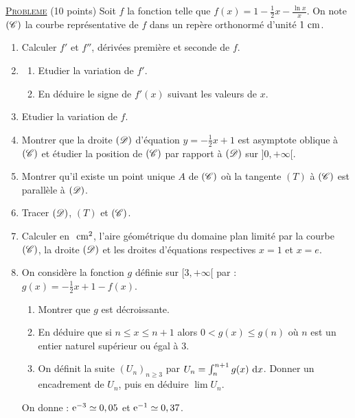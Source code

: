 \noindent \underline{\textsc{Probleme}} (10 points) \newline
      Soit $f$ la fonction telle que $f(x) = 1 - \frac{1}{2} x - \frac{\ln x}{x}$.
      On note $(\mathscr{C})$ la courbe repr\'esentative de $f$ dans un rep\`ere orthonorm\'e \Oij{} d'unit\'e $1~\mathrm{cm}$.
      \begin{enumerate}
            \item Calculer $f'$ et $f''$, d\'eriv\'ees premi\`ere et seconde de $f$.
            \item \begin{enumerate}
                        \item Etudier la variation de $f'$.
                        \item En d\'eduire le signe de $f'(x)$ suivant les valeurs de $x$.
                  \end{enumerate}
            \item Etudier la variation de $f$.
            \item Montrer que la droite $(\mathscr{D})$ d'\'equation $y = - \frac{1}{2} x + 1$ est asymptote oblique \`a $(\mathscr{C})$
                  et \'etudier la position de $(\mathscr{C})$ par rapport \`a $(\mathscr{D})$ sur $]0,+\infty[$.
            \item Montrer qu'il existe un point unique $A$ de $(\mathscr{C})$ o\`u la tangente $(T)$ \`a $(\mathscr{C})$ est
                  parall\`ele \`a $(\mathscr{D})$.
            \item Tracer $(\mathscr{D})$, $(T)$ et $(\mathscr{C})$.
            \item Calculer en $~\mathrm{cm}^2$, l'aire g\'eom\'etrique du domaine plan limit\'e par la courbe $(\mathscr{C})$, 
                  la droite $(\mathscr{D})$ et les droites d'\'equations respectives $x = 1$ et $x = e$.
            \item On consid\`ere la fonction $g$ d\'efinie sur $[3,+\infty[$ par : $g(x) = -\frac{1}{2} x + 1 - f(x)$.
                  \begin{enumerate}
                        \item Montrer que $g$ est d\'ecroissante.
                        \item En d\'eduire que si $n \leq x \leq n+1$ alors $0 < g(x) \leq g(n)$ o\`u $n$ est un entier naturel
                              sup\'erieur ou \'egal \`a $3$.
                        \item On d\'efinit la suite $(U_n)_{n\geq 3}$ par $U_n = \int_{n}^{n+1} g(x) ~\mathrm{d}x$.
                              Donner un encadrement de $U_n$, puis en d\'eduire $\lim U_n$.
                  \end{enumerate}
            \begin{center}
                  On donne : $\mathrm{e}^{-3} \simeq 0,05$ et $\mathrm{e}^{-1} \simeq 0,37$.
            \end{center}
      \end{enumerate}









